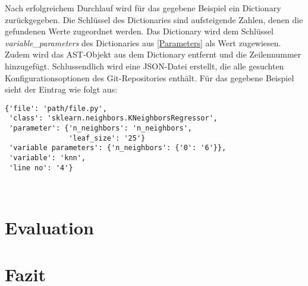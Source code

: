 \documentclass[german,bachelor]{swsLeipzig}
\begin{document}
Nach erfolgreichem Durchlauf wird für das gegebene Beispiel ein Dictionary zurückgegeben.
Die Schlüssel des Dictionaries sind aufsteigende Zahlen, denen die gefundenen Werte zugeordnet werden.
Das Dictionary wird dem Schlüssel \textit{variable\_parameters} des Dictionaries aus \ref{Parameters} als Wert zugewiesen.
Zudem wird das AST-Objekt aus dem Dictionary entfernt und die Zeilennummer hinzugefügt.
Schlussendlich wird eine JSON-Datei erstellt, die alle gesuchten Konfigurationsoptionen des Git-Repositories enthält.
Für das gegebene Beispiel sieht der Eintrag wie folgt aus: \\

\begin{lstlisting}[frame=single, basicstyle=\small]
{'file': 'path/file.py',
 'class': 'sklearn.neighbors.KNeighborsRegressor',
 'parameter': {'n_neighbors': 'n_neighbors',
               'leaf_size': '25'}
 'variable parameters': {'n_neighbors': {'0': '6'}},
 'variable': 'knn',
 'line no': '4'}
\end{lstlisting}
\


\chapter{Evaluation}\label{Evaluation}

\chapter{Fazit}\label{Fazit}
\end{document}
